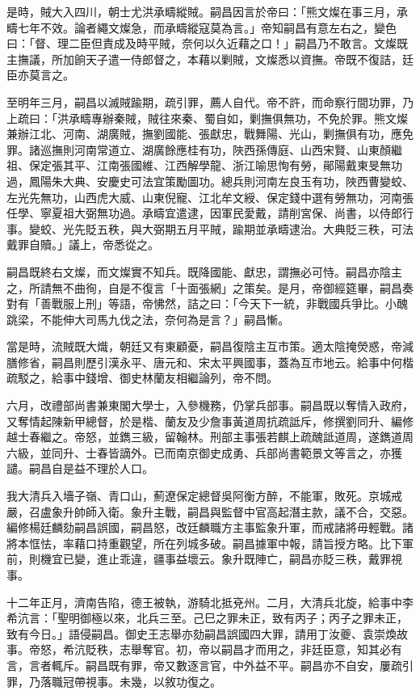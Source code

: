 \begin{pinyinscope}
是時，賊大入四川，朝士尤洪承疇縱賊。嗣昌因言於帝曰：「熊文燦在事三月，承疇七年不效。論者繩文燦急，而承疇縱寇莫為言。」帝知嗣昌有意左右之，變色曰：「督、理二臣但責成及時平賊，奈何以久近藉之口！」嗣昌乃不敢言。文燦既主撫議，所加餉天子遣一侍郎督之，本藉以剿賊，文燦悉以資撫。帝既不復詰，廷臣亦莫言之。

至明年三月，嗣昌以滅賊踰期，疏引罪，薦人自代。帝不許，而命察行間功罪，乃上疏曰：「洪承疇專辦秦賊，賊往來秦、蜀自如，剿撫俱無功，不免於罪。熊文燦兼辦江北、河南、湖廣賊，撫劉國能、張獻忠，戰舞陽、光山，剿撫俱有功，應免罪。諸巡撫則河南常道立、湖廣餘應桂有功，陜西孫傳庭、山西宋賢、山東顏繼祖、保定張其平、江南張國維、江西解學龍、浙江喻思恂有勞，鄖陽戴東旻無功過，鳳陽朱大典、安慶史可法宜策勵圖功。總兵則河南左良玉有功，陜西曹變蛟、左光先無功，山西虎大威、山東倪寵、江北牟文綬、保定錢中選有勞無功，河南張任學、寧夏祖大弼無功過。承疇宜遣逮，因軍民愛戴，請削宮保、尚書，以侍郎行事。變蛟、光先貶五秩，與大弼期五月平賊，踰期並承疇逮治。大典貶三秩，可法戴罪自贖。」議上，帝悉從之。

嗣昌既終右文燦，而文燦實不知兵。既降國能、獻忠，謂撫必可恃。嗣昌亦陰主之，所請無不曲徇，自是不復言「十面張網」之策矣。是月，帝御經筵畢，嗣昌奏對有「善戰服上刑」等語，帝怫然，詰之曰：「今天下一統，非戰國兵爭比。小醜跳梁，不能伸大司馬九伐之法，奈何為是言？」嗣昌慚。

當是時，流賊既大熾，朝廷又有東顧憂，嗣昌復陰主互市策。適太陰掩熒惑，帝減膳修省，嗣昌則歷引漢永平、唐元和、宋太平興國事，蓋為互市地云。給事中何楷疏駁之，給事中錢增、御史林蘭友相繼論列，帝不問。

六月，改禮部尚書兼東閣大學士，入參機務，仍掌兵部事。嗣昌既以奪情入政府，又奪情起陳新甲總督，於是楷、蘭友及少詹事黃道周抗疏詆斥，修撰劉同升、編修越士春繼之。帝怒，並鐫三級，留翰林。刑部主事張若麒上疏醜詆道周，遂鐫道周六級，並同升、士春皆謫外。已而南京御史成勇、兵部尚書範景文等言之，亦獲譴。嗣昌自是益不理於人口。

我大清兵入墻子嶺、青口山，薊遼保定總督吳阿衡方醉，不能軍，敗死。京城戒嚴，召盧象升帥師入衛。象升主戰，嗣昌與監督中官高起潛主款，議不合，交惡。編修楊廷麟劾嗣昌誤國，嗣昌怒，改廷麟職方主事監象升軍，而戒諸將毋輕戰。諸將本恇怯，率藉口持重觀望，所在列城多破。嗣昌據軍中報，請旨授方略。比下軍前，則機宜已變，進止乖違，疆事益壞云。象升既陣亡，嗣昌亦貶三秩，戴罪視事。

十二年正月，濟南告陷，德王被執，游騎北抵兗州。二月，大清兵北旋，給事中李希沆言：「聖明御極以來，北兵三至。己巳之罪未正，致有丙子；丙子之罪未正，致有今日。」語侵嗣昌。御史王志舉亦劾嗣昌誤國四大罪，請用丁汝夔、袁崇煥故事。帝怒，希沆貶秩，志舉奪官。初，帝以嗣昌才而用之，非廷臣意，知其必有言，言者輒斥。嗣昌既有罪，帝又數逐言官，中外益不平。嗣昌亦不自安，屢疏引罪，乃落職冠帶視事。未幾，以敘功復之。


\end{pinyinscope}
